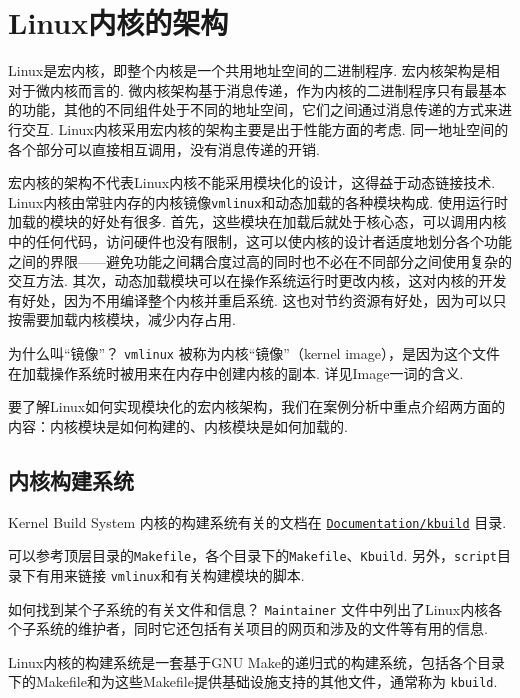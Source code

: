 \section{Linux内核的架构}
Linux是宏内核，即整个内核是一个共用地址空间的二进制程序.
宏内核架构是相对于微内核而言的.
微内核架构基于消息传递，作为内核的二进制程序只有最基本的功能，其他的不同组件处于不同的地址空间，它们之间通过消息传递的方式来进行交互.
Linux内核采用宏内核的架构主要是出于性能方面的考虑.\cite{silberschatz2021operating}
同一地址空间的各个部分可以直接相互调用，没有消息传递的开销.

宏内核的架构不代表Linux内核不能采用模块化的设计，这得益于动态链接技术.
Linux内核由常驻内存的内核镜像\lstinline{vmlinux}和动态加载的各种模块构成.
使用运行时加载的模块的好处有很多.
首先，这些模块在加载后就处于核心态，可以调用内核中的任何代码，访问硬件也没有限制，这可以使内核的设计者适度地划分各个功能之间的界限——避免功能之间耦合度过高的同时也不必在不同部分之间使用复杂的交互方法.
其次，动态加载模块可以在操作系统运行时更改内核，这对内核的开发有好处，因为不用编译整个内核并重启系统.
这也对节约资源有好处，因为可以只按需要加载内核模块，减少内存占用.

\begin{qbox}{为什么叫“镜像”？}
	\lstinline{vmlinux} 被称为内核“镜像”（kernel image），是因为这个文件在加载操作系统时被用来在内存中创建内核的副本.
	详见Image一词的含义\cite{imageWik70:online}.
\end{qbox}

要了解Linux如何实现模块化的宏内核架构，我们在案例分析中重点介绍两方面的内容：内核模块是如何构建的、内核模块是如何加载的.

\subsection{内核构建系统}
\begin{readsrcbox}{Kernel Build System}
	内核的构建系统有关的文档在 \href{https://docs.kernel.org/kbuild/index.html}{\lstinline{Documentation/kbuild}} 目录.

	可以参考顶层目录的\lstinline{Makefile}，各个目录下的\lstinline{Makefile}、\lstinline{Kbuild}.
	另外，\lstinline{script}目录下有用来链接 \lstinline{vmlinux}和有关构建模块的脚本.
\end{readsrcbox}
\begin{qbox}{如何找到某个子系统的有关文件和信息？}
	\lstinline{Maintainer} 文件中列出了Linux内核各个子系统的维护者，同时它还包括有关项目的网页和涉及的文件等有用的信息.
\end{qbox}
Linux内核的构建系统是一套基于GNU Make的递归式的构建系统，包括各个目录下的Makefile和为这些Makefile提供基础设施支持的其他文件，通常称为 \lstinline{kbuild}. \cite{LinuxKer71:online}

